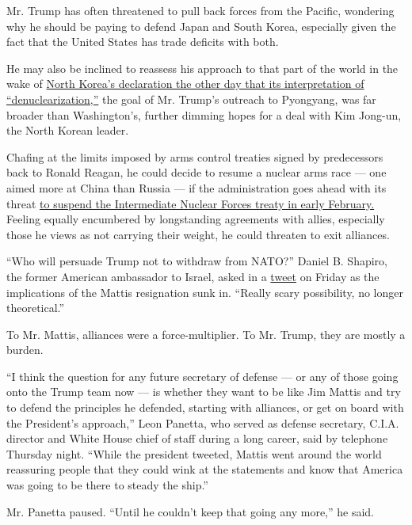Mr. Trump has often threatened to pull back forces from the Pacific,
wondering why he should be paying to defend Japan and South Korea,
especially given the fact that the United States has trade deficits with
both.

He may also be inclined to reassess his approach to that part of the
world in the wake of
\href{https://www.nytimes.com/2018/12/20/world/asia/north-korea-denuclearization.html?module=inline}{North
Korea's declaration the other day that its interpretation of
``denuclearization,''} the goal of Mr. Trump's outreach to Pyongyang,
was far broader than Washington's, further dimming hopes for a deal with
Kim Jong-un, the North Korean leader.

Chafing at the limits imposed by arms control treaties signed by
predecessors back to Ronald Reagan, he could decide to resume a nuclear
arms race --- one aimed more at China than Russia --- if the
administration goes ahead with its threat
\href{https://www.nytimes.com/2018/12/09/us/politics/trump-nuclear-arms-treaty-russia.html}{to
suspend the Intermediate Nuclear Forces treaty in early February.}
Feeling equally encumbered by longstanding agreements with allies,
especially those he views as not carrying their weight, he could
threaten to exit alliances.

``Who will persuade Trump not to withdraw from NATO?'' Daniel B.
Shapiro, the former American ambassador to Israel, asked in a
\href{https://twitter.com/DanielBShapiro/status/1076167846722523137}{tweet}
on Friday as the implications of the Mattis resignation sunk in.
``Really scary possibility, no longer theoretical.''

To Mr. Mattis, alliances were a force-multiplier. To Mr. Trump, they are
mostly a burden.

``I think the question for any future secretary of defense --- or any of
those going onto the Trump team now --- is whether they want to be like
Jim Mattis and try to defend the principles he defended, starting with
alliances, or get on board with the President's approach,'' Leon
Panetta, who served as defense secretary, C.I.A. director and White
House chief of staff during a long career, said by telephone Thursday
night. ``While the president tweeted, Mattis went around the world
reassuring people that they could wink at the statements and know that
America was going to be there to steady the ship.''

Mr. Panetta paused. ``Until he couldn't keep that going any more,'' he
said.

